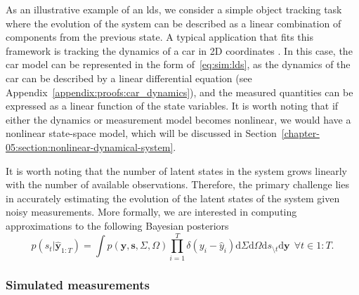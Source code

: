 As an illustrative example of an \ac{lds}, we consider a simple object
tracking task where the evolution of the system can be described as a linear combination of
components from the previous state.
A typical application that fits this framework is tracking the dynamics of a car in 2D
coordinates \citep{sarkka_bayesian_2013}.
In this case, the car model can be represented in the form of~\eqref{eq:sim:lds}, as the
dynamics of the car can be described by a linear differential equation (see
Appendix~\ref{appendix:proofs:car_dynamics}), and the measured quantities can be expressed as
a linear function of the state variables.
It is worth noting that if either the dynamics or measurement model becomes nonlinear, we
would have a nonlinear state-space model, which will be discussed in
Section~\ref{chapter-05:section:nonlinear-dynamical-system}.


It is worth noting that the number of latent states in the system grows linearly with the
number of available observations.
Therefore, the primary challenge lies in accurately estimating the evolution of
the latent states of the system given noisy measurements. 
More formally, we are interested in computing approximations to the following Bayesian posteriors
\begin{equation}
    \label{eq:sim:lds-problem-statement}
    p(s_t\vert\hat{\bm{y}}_{1:T}) = \int p(\bm{y}, \bm{s}, \Sigma, \Omega)\prod_{i = 1}^{T}\delta(y_i - \hat{y}_i)\mathrm{d}\Sigma\mathrm{d}\Omega\mathrm{d}s_{\setminus t}\mathrm{d}\bm{y}~~\forall t \in 1:T.
\end{equation}

\subsubsection{Simulated measurements}

